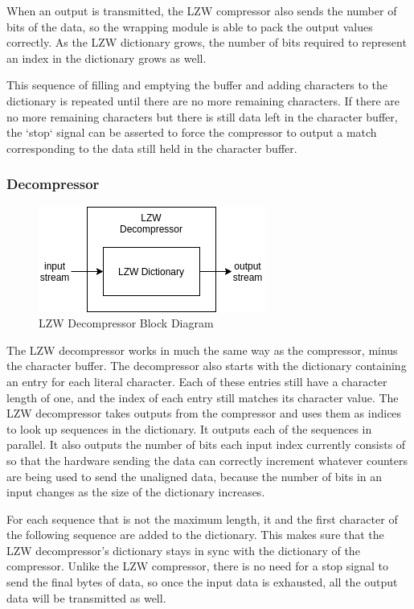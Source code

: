 \documentclass[doublespace,nopageskip]{VTthesis}
\begin{document}
When an output is transmitted, the LZW compressor also sends the number of bits of the data, so the wrapping module is able to pack the output values correctly. As the LZW dictionary grows, the number of bits required to represent an index in the dictionary grows as well.

This sequence of filling and emptying the buffer and adding characters to the dictionary is repeated until there are no more remaining characters. If there are no more remaining characters but there is still data left in the character buffer, the `stop` signal can be asserted to force the compressor to output a match corresponding to the data still held in the character buffer.

\subsubsection{Decompressor}\label{sss:lzw_decompressor_implementation}

\begin{figure}[htb]
	\centering
	\includegraphics[scale=1]{LZW Decompressor.png}
	\caption{LZW Decompressor Block Diagram}
	\label{fig:lzw_decompressor_block_diagram}
\end{figure}

The LZW decompressor works in much the same way as the compressor, minus the character buffer. The decompressor also starts with the dictionary containing an entry for each literal character. Each of these entries still have a character length of one, and the index of each entry still matches its character value. The LZW decompressor takes outputs from the compressor and uses them as indices to look up sequences in the dictionary. It outputs each of the sequences in parallel. It also outputs the number of bits each input index currently consists of so that the hardware sending the data can correctly increment whatever counters are being used to send the unaligned data, because the number of bits in an input changes as the size of the dictionary increases.

For each sequence that is not the maximum length, it and the first character of the following sequence are added to the dictionary. This makes sure that the LZW decompressor's dictionary stays in sync with the dictionary of the compressor. Unlike the LZW compressor, there is no need for a stop signal to send the final bytes of data, so once the input data is exhausted, all the output data will be transmitted as well.
\end{document}
